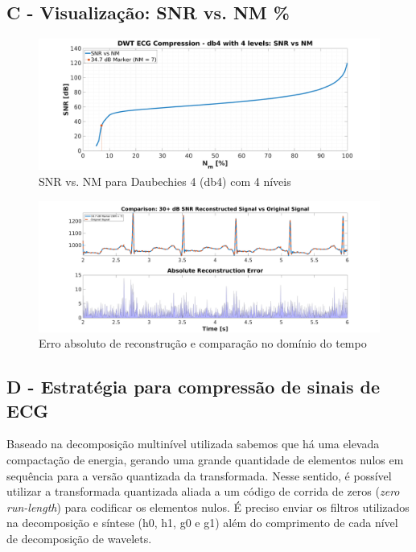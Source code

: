 \documentclass{article}
\begin{document}
\subsection*{C - Visualização: SNR vs. NM \%}
\begin{figure}[H]
	\begin{center}
		\includegraphics[scale=0.25]{../Q4_SNR-vs-NM.png}
		\caption{SNR vs. NM para Daubechies 4 (db4) com 4 níveis}
		\label{fig:Q4_SNR}
	\end{center}
\end{figure}

\begin{figure}[H]
	\begin{center}
		\includegraphics[scale=0.25]{../Q4_Recon-Error.png}
		\caption{Erro absoluto de reconstrução e comparação no domínio do tempo}
		\label{fig:Q4_Signal}
	\end{center}
\end{figure}

\subsection*{D - Estratégia para compressão de sinais de ECG}
\begin{multicols}{2}
Baseado na decomposição multinível utilizada sabemos que há uma elevada compactação de energia, gerando uma grande quantidade de elementos nulos em sequência para a versão quantizada da transformada. Nesse sentido, é possível utilizar a transformada quantizada aliada a um código de corrida de zeros (\textit{zero run-length}) para codificar os elementos nulos. É preciso enviar os filtros utilizados na decomposição e síntese (h0, h1, g0 e g1) além do comprimento de cada nível de decomposição de wavelets.
\end{multicols}
\end{document}
